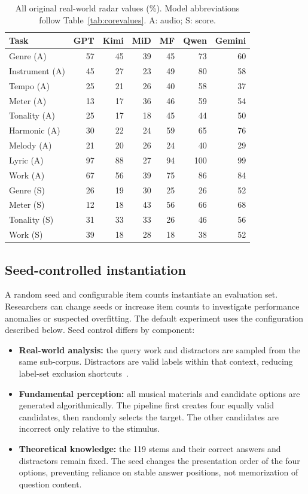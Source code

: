 \documentclass{article}
\begin{document}
\begin{table}[t]
\centering
\caption{All original real-world radar values (\%). Model abbreviations follow Table~\ref{tab:corevalues}. A: audio; S: score.}
\label{tab:realvalues}
\begin{tabularx}{\textwidth}{@{}Xrrrrrr@{}}
\toprule
\textbf{Task} & \textbf{GPT} & \textbf{Kimi} & \textbf{MiD} & \textbf{MF} & \textbf{Qwen} & \textbf{Gemini}\\
\midrule
Genre (A) & 57 & 45 & 39 & 45 & 73 & 60\\
Instrument (A) & 45 & 27 & 23 & 49 & 80 & 58\\
Tempo (A) & 25 & 21 & 26 & 40 & 58 & 37\\
Meter (A) & 13 & 17 & 36 & 46 & 59 & 54\\
Tonality (A) & 25 & 17 & 18 & 45 & 44 & 50\\
Harmonic (A) & 30 & 22 & 24 & 59 & 65 & 76\\
Melody (A) & 21 & 20 & 26 & 24 & 40 & 29\\
Lyric (A) & 97 & 88 & 27 & 94 & 100 & 99\\
Work (A) & 67 & 56 & 39 & 75 & 86 & 84\\
Genre (S) & 26 & 19 & 30 & 25 & 26 & 52\\
Meter (S) & 12 & 18 & 43 & 56 & 66 & 68\\
Tonality (S) & 31 & 33 & 33 & 26 & 46 & 56\\
Work (S) & 39 & 18 & 28 & 18 & 38 & 52\\
\bottomrule
\end{tabularx}
\end{table}

\subsection{Seed-controlled instantiation}
A random seed and configurable item counts instantiate an evaluation set. Researchers can change seeds or increase item counts to investigate performance anomalies or suspected overfitting. The default experiment uses the configuration described below. Seed control differs by component:
\begin{itemize}
\item \textbf{Real-world analysis:} the query work and distractors are sampled from the same sub-corpus. Distractors are valid labels within that context, reducing label-set exclusion shortcuts~\cite{DBLP:conf/ismir/ZangOBMN25}.
\item \textbf{Fundamental perception:} all musical materials and candidate options are generated algorithmically. The pipeline first creates four equally valid candidates, then randomly selects the target. The other candidates are incorrect only relative to the stimulus.
\item \textbf{Theoretical knowledge:} the 119 stems and their correct answers and distractors remain fixed. The seed changes the presentation order of the four options, preventing reliance on stable answer positions, not memorization of question content.
\end{itemize}
\end{document}
